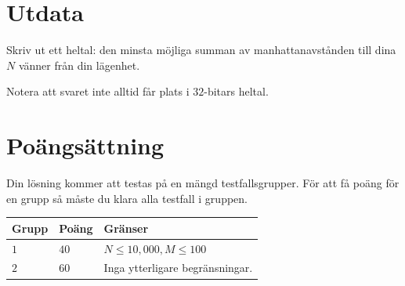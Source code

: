 \section*{Utdata}
Skriv ut ett heltal: den minsta möjliga summan av manhattanavstånden till dina $N$ vänner från din lägenhet.

Notera att svaret inte alltid får plats i $32$-bitars heltal.

\section*{Poängsättning}
Din lösning kommer att testas på en mängd testfallsgrupper.
För att få poäng för en grupp så måste du klara alla testfall i gruppen.

\noindent
\begin{tabular}{| l | l | p{12cm} |}
  \hline
  \textbf{Grupp} & \textbf{Poäng} & \textbf{Gränser} \\ \hline
  $1$   & $40$       & $N \leq 10{,}000, M \leq 100$ \\ \hline
  $2$   & $60$       & Inga ytterligare begränsningar. \\ \hline
\end{tabular}

